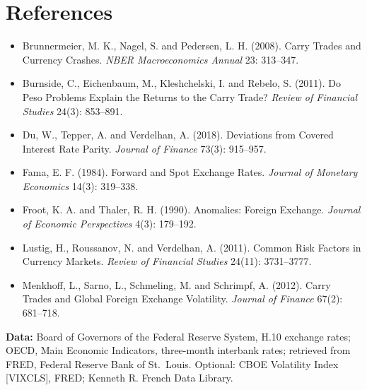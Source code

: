 \section*{References}

\begin{itemize}
  \item Brunnermeier, M. K., Nagel, S. and Pedersen, L. H. (2008). Carry Trades and Currency Crashes. \emph{NBER Macroeconomics Annual} 23: 313--347.
  \item Burnside, C., Eichenbaum, M., Kleshchelski, I. and Rebelo, S. (2011). Do Peso Problems Explain the Returns to the Carry Trade? \emph{Review of Financial Studies} 24(3): 853--891.
  \item Du, W., Tepper, A. and Verdelhan, A. (2018). Deviations from Covered Interest Rate Parity. \emph{Journal of Finance} 73(3): 915--957.
  \item Fama, E. F. (1984). Forward and Spot Exchange Rates. \emph{Journal of Monetary Economics} 14(3): 319--338.
  \item Froot, K. A. and Thaler, R. H. (1990). Anomalies: Foreign Exchange. \emph{Journal of Economic Perspectives} 4(3): 179--192.
  \item Lustig, H., Roussanov, N. and Verdelhan, A. (2011). Common Risk Factors in Currency Markets. \emph{Review of Financial Studies} 24(11): 3731--3777.
  \item Menkhoff, L., Sarno, L., Schmeling, M. and Schrimpf, A. (2012). Carry Trades and Global Foreign Exchange Volatility. \emph{Journal of Finance} 67(2): 681--718.
\end{itemize}

\textbf{Data:} Board of Governors of the Federal Reserve System, H.10 exchange rates; OECD, Main Economic Indicators, three-month interbank rates; retrieved from FRED, Federal Reserve Bank of St.\ Louis. Optional: CBOE Volatility Index [VIXCLS], FRED; Kenneth R. French Data Library.
